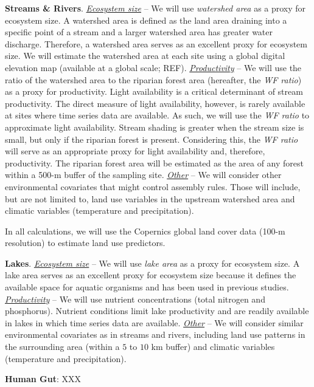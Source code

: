 \documentclass[12pt, class=article, crop=false]{standalone}
\begin{document}
\textbf{Streams \& Rivers}.
\ul{\textit{Ecosystem size}} --
We will use \textit{watershed area} as a proxy for ecosystem size.
A watershed area is defined as the land area draining into a specific point of a stream and a larger watershed area has greater water discharge.
Therefore, a watershed area serves as an excellent proxy for ecosystem size.
We will estimate the watershed area at each site using a global digital elevation map (available at a global scale; REF).
\ul{\textit{Productivity}} -- 
We will use the ratio of the watershed area to the riparian forest area (hereafter, the \textit{WF ratio}) as a proxy for productivity.
Light availability is a critical determinant of stream productivity.
The direct measure of light availability, however, is rarely available at sites where time series data are available.
As such, we will use the \textit{WF ratio} to approximate light availability.
Stream shading is greater when the stream size is small, but only if the riparian forest is present.
Considering this, the \textit{WF ratio} will serve as an appropriate proxy for light availability and, therefore, productivity.
The riparian forest area will be estimated as the area of any forest within a 500-m buffer of the sampling site.
\ul{\textit{Other}} -- We will consider other environmental covariates that might control assembly rules. Those will include, but are not limited to, land use variables in the upstream watershed area and climatic variables (temperature and precipitation).

In all calculations, we will use the Copernics global land cover data (100-m resolution) to estimate land use predictors.

\textbf{Lakes}.
\ul{\textit{Ecosystem size}} --
We will use \textit{lake area} as a proxy for ecosystem size.
A lake area serves as an excellent proxy for ecosystem size because it defines the available space for aquatic organisms and has been used in previous studies.
\ul{\textit{Productivity}} -- 
We will use nutrient concentrations (total nitrogen and phosphorus).  
Nutrient conditions limit lake productivity and are readily available in lakes in which time series data are available.
\ul{\textit{Other}} -- We will consider similar environmental covariates as in streams and rivers, including land use patterns in the surrounding area (within a $5$ to $10$ km buffer) and climatic variables (temperature and precipitation).

\textbf{Human Gut}: XXX

\newpage


\end{document}
